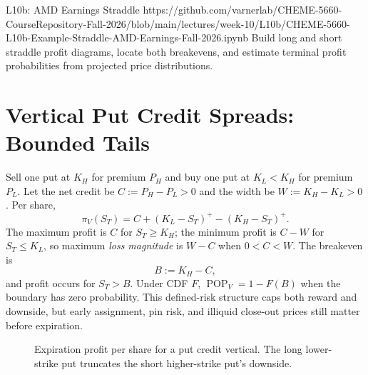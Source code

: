 \documentclass[11pt]{article}
\begin{document}
\notebooklink
  {L10b: AMD Earnings Straddle}
  {https://github.com/varnerlab/CHEME-5660-CourseRepository-Fall-2026/blob/main/lectures/week-10/L10b/CHEME-5660-L10b-Example-Straddle-AMD-Earnings-Fall-2026.ipynb}
  {Build long and short straddle profit diagrams, locate both breakevens, and estimate terminal profit probabilities from projected price distributions.}

\section{Vertical Put Credit Spreads: Bounded Tails}

Sell one put at $K_H$ for premium $P_H$ and buy one put at $K_L<K_H$ for premium $P_L$. Let the net credit be $C:=P_H-P_L>0$ and the width be $W:=K_H-K_L>0$. Per share,
\begin{equation}
  \label{eq:put-spread-profit}
  \pi_V(S_T)=C+(K_L-S_T)^+-(K_H-S_T)^+.
\end{equation}
The maximum profit is $C$ for $S_T\geq K_H$; the minimum profit is $C-W$ for $S_T\leq K_L$, so maximum \emph{loss magnitude} is $W-C$ when $0<C<W$. The breakeven is
\begin{equation}
  \label{eq:put-spread-breakeven}
  B:=K_H-C,
\end{equation}
and profit occurs for $S_T>B$. Under CDF $F$, $\operatorname{POP}_V=1-F(B)$ when the boundary has zero probability. This defined-risk structure caps both reward and downside, but early assignment, pin risk, and illiquid close-out prices still matter before expiration.

\begin{figure}[ht]
  \centering
  \caption{Expiration profit per share for a put credit vertical. The long lower-strike put truncates the short higher-strike put's downside.}
  \label{fig:vertical-profit}
\end{figure}
\end{document}
